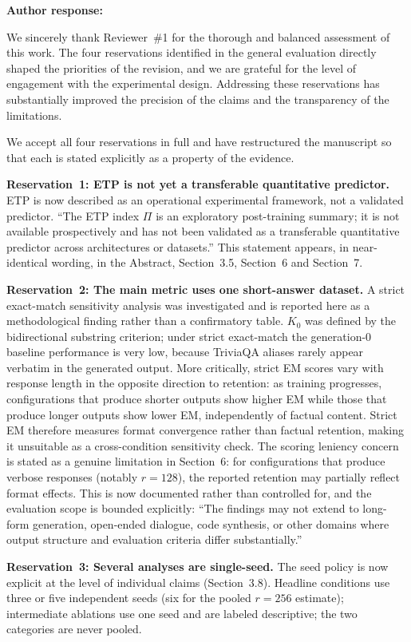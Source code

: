 \documentclass[11pt,a4paper]{article}
\newcommand{\arhead}[1]{\medskip\noindent\textbf{#1}\par\smallskip}
\newcommand{\newtext}[1]{\textcolor{chgcolor}{``#1''}}
\begin{document}
\arhead{Author response:}
We sincerely thank Reviewer~\#1 for the thorough and balanced assessment of this work. The four reservations identified in the general evaluation directly shaped the priorities of the revision, and we are grateful for the level of engagement with the experimental design. Addressing these reservations has substantially improved the precision of the claims and the transparency of the limitations.

We accept all four reservations in full and have restructured the
manuscript so that each is stated explicitly as a property of the evidence.

\textbf{Reservation~1: ETP is not yet a transferable quantitative predictor.}
ETP is now described as an operational experimental framework, not a
validated predictor. \newtext{The ETP index $\Pi$ is an exploratory
post-training summary; it is not available prospectively and has not been
validated as a transferable quantitative predictor across architectures or
datasets.} This statement appears, in near-identical wording, in the Abstract, Section~3.5, Section~6 and Section~7.

\textbf{Reservation~2: The main metric uses one short-answer dataset.}
A strict exact-match sensitivity analysis was investigated and is reported
here as a methodological finding rather than a confirmatory table.
$K_0$ was defined by the bidirectional substring criterion; under strict
exact-match the generation-0 baseline performance is very low, because
TriviaQA aliases rarely appear verbatim in the generated output. More
critically, strict EM scores vary with response length in the opposite
direction to retention: as training progresses, configurations that produce
shorter outputs show higher EM while those that produce longer outputs show
lower EM, independently of factual content. Strict EM therefore measures
format convergence rather than factual retention, making it unsuitable as
a cross-condition sensitivity check. The scoring leniency concern is stated
as a genuine limitation in Section~6: for configurations that produce verbose
responses (notably $r=128$), the reported retention may partially reflect
format effects. This is now documented rather than controlled for, and the
evaluation scope is bounded explicitly: \newtext{The findings may not extend to long-form generation, open-ended dialogue, code synthesis, or other domains where output structure and evaluation criteria differ substantially.}

\textbf{Reservation~3: Several analyses are single-seed.}
The seed policy is now explicit at the level of individual claims
(Section~3.8). Headline conditions use three or five independent seeds
(six for the pooled $r=256$ estimate);
intermediate ablations use one seed and are labeled descriptive; the two
categories are never pooled.
\end{document}
